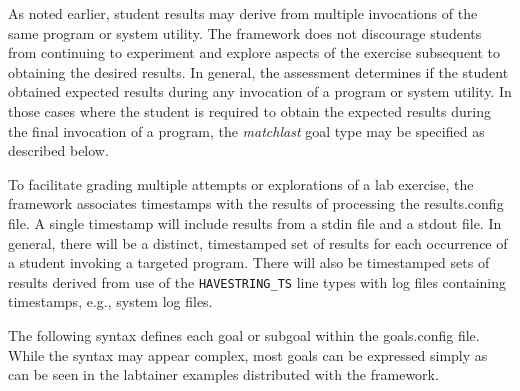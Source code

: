 \documentclass[12pt]{article}
\begin{document}
As noted earlier, student results may derive from multiple invocations of the same program or system utility.  
The framework does not discourage students from continuing to experiment and explore aspects of the 
exercise subsequent to obtaining the desired results.  In general, the assessment determines if the student
obtained expected results during any invocation of a program or system utility.  In those cases 
where the student is required to obtain the expected results during the final invocation of a program, 
the \textit{matchlast} goal type may be specified as described below.

To facilitate grading multiple attempts or explorations of a lab exercise, the framework associates
timestamps with the results of processing the results.config file.  A single timestamp will
include results from a stdin file and a stdout file.  In general, there will be a distinct, 
timestamped set of results for each occurrence of a student invoking a targeted program. There will also
be timestamped sets of results derived from use of the {\tt HAVESTRING\_TS} line types with log files
containing timestamps, e.g., system log files.

The following syntax defines each goal or subgoal within the goals.config file.  While the syntax
may appear complex, most goals can be expressed simply as can be seen in the labtainer examples distributed
with the framework.
\end{document}
